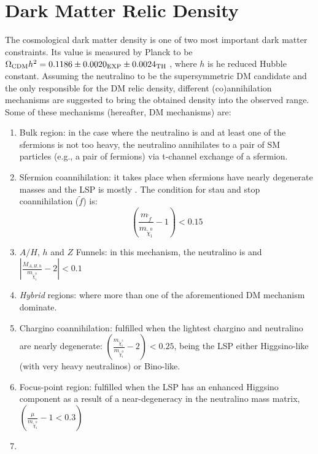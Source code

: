 \section{Dark Matter Relic Density}
The cosmological dark matter density  is one of two most important dark matter constraints. Its value is measured by Planck to be $\Omega_{\rm CDM}h^2 = 0.1186 \pm 0.0020_{\rm EXP} \pm 0.0024_{\rm TH}$ , where $h$ is he reduced Hubble constant.%
Assuming the neutralino to be the supersymmetric DM candidate and the only responsible for the DM relic density, different (co)annihilation mechanisms are suggested to bring the obtained density into the observed range. Some of these mechanisms (hereafter, DM mechanisms) are: 
\begin{enumerate}
\item Bulk region: in the case where the neutralino is  and at least one of the sfermions is not too heavy, the neutralino annihilates to a pair of SM particles (e.g., a pair of fermions) via t-channel exchange of a sfermion. 
\item Sfermion coannihilation: it takes place when sfermions have nearly degenerate masses and the LSP is mostly . The condition for stau and stop coannihilation ($\tilde{f}$) is:
\begin{equation}
\left( \frac{m_{\tilde{f}}}{m_{\tilde{\chi}^0_1}} - 1 \right) < 0.15
\end{equation}
\item $A/H$, $h$ and $Z$ Funnels: in this mechanism, the neutralino is  and $\left | \frac{M_{A,H,h}}{m_{\tilde{\chi}_1^0}} - 2 \right | < 0.1$
\item \textit{Hybrid} regions: where more than one of the aforementioned DM mechanism dominate. 
\item Chargino coannihilation: fulfilled when the lightest chargino and neutralino are nearly degenerate: $\left ( \frac{m_{\tilde{\chi}_1^{\pm}}}{m_{\tilde{\chi}_1^0}} - 2 \right ) < 0.25$, being the LSP either Higgsino-like (with very heavy neutralinos) or Bino-like. 
\item Focus-point region: fulfilled when the LSP has an enhanced Higgsino component as a result of a near-degeneracy in the neutralino mass matrix, $\left( \frac{\mu}{m_{\tilde{\chi}_1^0}} - 1 < 0.3 \right)$
\item {}
\end{enumerate}

